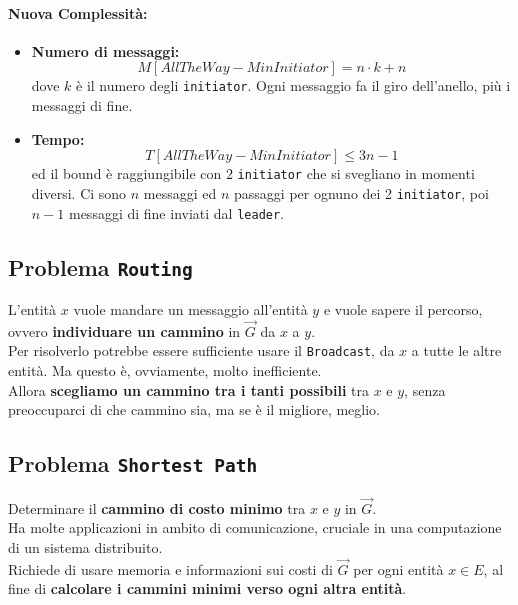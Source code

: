 \paragraph{Nuova Complessità:}
\begin{itemize}
	\item \textbf{Numero di messaggi:}
	$$ M[AllTheWay - MinInitiator] = n \cdot k + n $$
	dove $k$ è il numero degli \texttt{initiator}. Ogni messaggio fa il giro dell'anello, più i messaggi di fine.\\
	
	\item \textbf{Tempo:}
	$$ T[AllTheWay - MinInitiator] \leq 3n - 1 $$
	ed il bound è raggiungibile con $2$ \texttt{initiator} che si svegliano in momenti diversi. Ci sono $n$ messaggi ed $n$ passaggi per ognuno dei 2 \texttt{initiator}, poi $n-1$ messaggi di fine inviati dal \texttt{leader}.\\
\end{itemize}


\newpage

\subsection{Problema \texttt{Routing}}
L'entità $x$ vuole mandare un messaggio all'entità $y$ e vuole sapere il percorso, ovvero \textbf{individuare un cammino} in $\vec{G}$ da $x$ a $y$.\\

Per risolverlo potrebbe essere sufficiente usare il \texttt{Broadcast}, da $x$ a tutte le altre entità. Ma questo è, ovviamente, molto inefficiente.\\

Allora \textbf{scegliamo un cammino tra i tanti possibili} tra $x$ e $y$, senza preoccuparci di che cammino sia, ma se è il migliore, meglio.\\

\subsection{Problema \texttt{Shortest Path}}
Determinare il \textbf{cammino di costo minimo} tra $x$ e $y$ in $\vec{G}$.\\
Ha molte applicazioni in ambito di comunicazione, cruciale in una computazione di un sistema distribuito.\\

Richiede di usare memoria e informazioni sui costi di $\vec{G}$ per ogni entità $x \in E$, al fine di \textbf{calcolare i cammini minimi verso ogni altra entità}.

